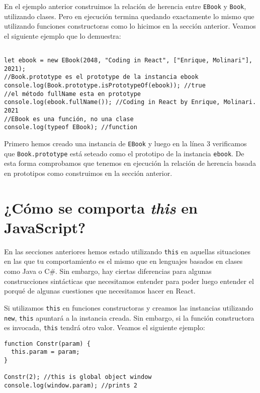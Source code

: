 \documentclass[a4paper, oneside, titlepage, 12pt]{paper}
\begin{document}
En el ejemplo anterior construimos la relación de herencia entre \texttt{EBook} y \texttt{Book}, utilizando clases. Pero en ejecución termina quedando exactamente lo mismo que utilizando funciones constructoras como lo hicimos en la sección anterior. Veamos el siguiente ejemplo que lo demuestra:

\begin{verbatim}

let ebook = new EBook(2048, "Coding in React", ["Enrique, Molinari"], 2021);
//Book.prototype es el prototype de la instancia ebook
console.log(Book.prototype.isPrototypeOf(ebook)); //true
//el método fullName esta en prototype
console.log(ebook.fullName()); //Coding in React by Enrique, Molinari. 2021
//EBook es una función, no una clase
console.log(typeof EBook); //function
\end{verbatim}

Primero hemos creado una instancia de \texttt{EBook} y luego en la línea 3 verificamos que \texttt{Book.prototype} está seteado como el prototipo de la instancia \texttt{ebook}. De esta forma comprobamos que tenemos en ejecución la relación de herencia basada en prototipos como construimos en la sección anterior.

\section{¿Cómo se comporta \textit{this} en JavaScript?} \label{meaning_of_this}

En las secciones anteriores hemos estado utilizando \texttt{this} en aquellas situaciones en las que tu comportamiento es el mismo que en lenguajes basados en clases como Java o C\#. Sin embargo, hay ciertas diferencias para algunas construcciones sintácticas que necesitamos entender para poder luego entender el porqué de algunas cuestiones que necesitamos hacer en React.
\newline

Si utilizamos \texttt{this} en funciones constructoras y creamos las instancias utilizando \texttt{new}, \texttt{this} apuntará a la instancia creada. Sin embargo, si la función constructora es invocada, \texttt{this} tendrá otro valor. Veamos el siguiente ejemplo:

\begin{verbatim}
function Constr(param) {
  this.param = param;
}

Constr(2); //this is global object window
console.log(window.param); //prints 2
\end{verbatim}
\end{document}
